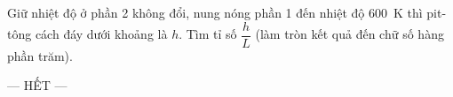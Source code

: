 	\begin{ex}%
		\label{PhuTho-SoGD-Lan1-III6}
		Giữ nhiệt độ ở phần 2 không đổi, nung nóng phần 1 đến nhiệt độ $600$~K thì pit-tông cách đáy dưới khoảng là $h$. Tìm tỉ số $\dfrac{h}{L}$ (làm tròn kết quả đến chữ số hàng phần trăm).
		\par
	\end{ex}

	\centerline{--- HẾT ---}


